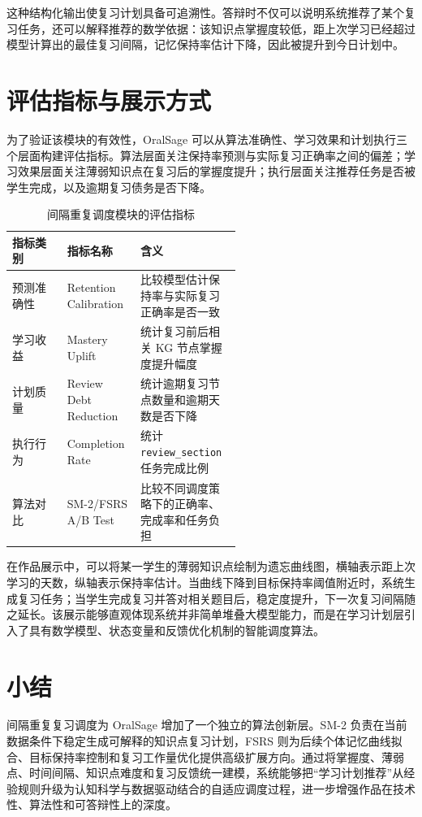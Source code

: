 这种结构化输出使复习计划具备可追溯性。答辩时不仅可以说明系统推荐了某个复习任务，还可以解释推荐的数学依据：该知识点掌握度较低，距上次学习已经超过模型计算出的最佳复习间隔，记忆保持率估计下降，因此被提升到今日计划中。

\section{评估指标与展示方式}

为了验证该模块的有效性，OralSage 可以从算法准确性、学习效果和计划执行三个层面构建评估指标。算法层面关注保持率预测与实际复习正确率之间的偏差；学习效果层面关注薄弱知识点在复习后的掌握度提升；执行层面关注推荐任务是否被学生完成，以及逾期复习债务是否下降。

\begin{table}[H]
  \centering
  \caption{间隔重复调度模块的评估指标}
  \label{tab:spaced-review-evaluation}
  \begin{tabularx}{\linewidth}{p{0.24\linewidth}p{0.32\linewidth}X}
    \toprule
    指标类别 & 指标名称 & 含义 \\
    \midrule
    预测准确性 & Retention Calibration & 比较模型估计保持率与实际复习正确率是否一致 \\
    学习收益 & Mastery Uplift & 统计复习前后相关 KG 节点掌握度提升幅度 \\
    计划质量 & Review Debt Reduction & 统计逾期复习节点数量和逾期天数是否下降 \\
    执行行为 & Completion Rate & 统计 \texttt{review\_section} 任务完成比例 \\
    算法对比 & SM-2/FSRS A/B Test & 比较不同调度策略下的正确率、完成率和任务负担 \\
    \bottomrule
  \end{tabularx}
\end{table}

在作品展示中，可以将某一学生的薄弱知识点绘制为遗忘曲线图，横轴表示距上次学习的天数，纵轴表示保持率估计。当曲线下降到目标保持率阈值附近时，系统生成复习任务；当学生完成复习并答对相关题目后，稳定度提升，下一次复习间隔随之延长。该展示能够直观体现系统并非简单堆叠大模型能力，而是在学习计划层引入了具有数学模型、状态变量和反馈优化机制的智能调度算法。

\section{小结}

间隔重复复习调度为 OralSage 增加了一个独立的算法创新层。SM-2 负责在当前数据条件下稳定生成可解释的知识点复习计划，FSRS 则为后续个体记忆曲线拟合、目标保持率控制和复习工作量优化提供高级扩展方向。通过将掌握度、薄弱点、时间间隔、知识点难度和复习反馈统一建模，系统能够把“学习计划推荐”从经验规则升级为认知科学与数据驱动结合的自适应调度过程，进一步增强作品在技术性、算法性和可答辩性上的深度。
